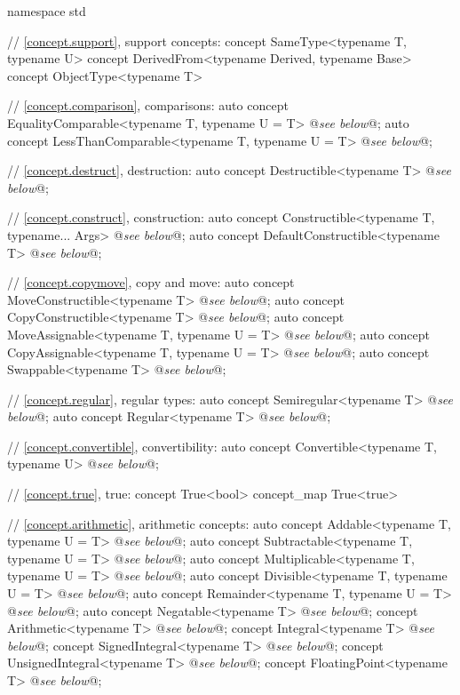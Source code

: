 \documentclass[american,twoside]{book}
\begin{document}
\begin{codeblock}
namespace std {
  // \ref{concept.support}, support concepts:
  concept SameType<typename T, typename U> {  }
  concept DerivedFrom<typename Derived, typename Base> { }
  concept ObjectType<typename T> { }

  // \ref{concept.comparison}, comparisons:
  auto concept EqualityComparable<typename T, typename U = T> @\textit{see below}@;
  auto concept LessThanComparable<typename T, typename U = T> @\textit{see below}@;

  // \ref{concept.destruct}, destruction:
  auto concept Destructible<typename T> @\textit{see below}@;

  // \ref{concept.construct}, construction:
  auto concept Constructible<typename T, typename... Args> @\textit{see below}@;
  auto concept DefaultConstructible<typename T> @\textit{see below}@;

  // \ref{concept.copymove}, copy and move:
  auto concept MoveConstructible<typename T> @\textit{see below}@;
  auto concept CopyConstructible<typename T> @\textit{see below}@;
  auto concept MoveAssignable<typename T, typename U = T> @\textit{see below}@;
  auto concept CopyAssignable<typename T, typename U = T> @\textit{see below}@;
  auto concept Swappable<typename T> @\textit{see below}@;

  // \ref{concept.regular}, regular types:
  auto concept Semiregular<typename T> @\textit{see below}@;
  auto concept Regular<typename T> @\textit{see below}@;

  // \ref{concept.convertible}, convertibility:
  auto concept Convertible<typename T, typename U> @\textit{see below}@;

  // \ref{concept.true}, true:
  concept True<bool> { }
  concept_map True<true> { }

  // \ref{concept.arithmetic}, arithmetic concepts:
  auto concept Addable<typename T, typename U = T> @\textit{see below}@;
  auto concept Subtractable<typename T, typename U = T> @\textit{see below}@;
  auto concept Multiplicable<typename T, typename U = T> @\textit{see below}@;
  auto concept Divisible<typename T, typename U = T> @\textit{see below}@;
  auto concept Remainder<typename T, typename U = T> @\textit{see below}@;
  auto concept Negatable<typename T> @\textit{see below}@;
  concept Arithmetic<typename T> @\textit{see below}@;
  concept Integral<typename T> @\textit{see below}@;
  concept SignedIntegral<typename T> @\textit{see below}@;
  concept UnsignedIntegral<typename T> @\textit{see below}@;
  concept FloatingPoint<typename T> @\textit{see below}@;

}
\end{codeblock}
\end{document}
